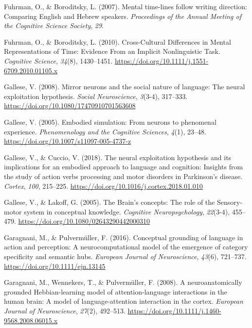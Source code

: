 \documentclass[
  a4paper,12pt,twoside,onecolumn,openright,final,oldfontcommands]{memoir}
\newlength{\cslhangindent}
\newlength{\cslentryspacingunit} %
\newenvironment{CSLReferences}[2] %
 {%
  \setlength{\parindent}{0pt}
  \ifodd #1
  \let\oldpar\par
  \def\par{\hangindent=\cslhangindent\oldpar}
  \fi
  \setlength{\parskip}{#2\cslentryspacingunit}
 }%
 {}
\begin{document}
\begin{CSLReferences}{1}{0}
\leavevmode{}%
Fuhrman, O., \& Boroditsky, L. (2007). Mental time-lines follow writing direction: {Comparing} {English} and {Hebrew} speakers. \emph{Proceedings of the Annual Meeting of the Cognitive Science Society}, \emph{29}.

\leavevmode{}%
Fuhrman, O., \& Boroditsky, L. (2010). Cross-{Cultural} {Differences} in {Mental} {Representations} of {Time}: {Evidence} {From} an {Implicit} {Nonlinguistic} {Task}. \emph{Cognitive Science}, \emph{34}(8), 1430--1451. \url{https://doi.org/10.1111/j.1551-6709.2010.01105.x}

\leavevmode{}%
Gallese, V. (2008). Mirror neurons and the social nature of language: {The} neural exploitation hypothesis. \emph{Social Neuroscience}, \emph{3}(3-4), 317--333. \url{https://doi.org/10.1080/17470910701563608}

\leavevmode{}%
Gallese, V. (2005). Embodied simulation: {From} neurons to phenomenal experience. \emph{Phenomenology and the Cognitive Sciences}, \emph{4}(1), 23--48. \url{https://doi.org/10.1007/s11097-005-4737-z}

\leavevmode{}%
Gallese, V., \& Cuccio, V. (2018). The neural exploitation hypothesis and its implications for an embodied approach to language and cognition: {Insights} from the study of action verbs processing and motor disorders in {Parkinson}'s disease. \emph{Cortex}, \emph{100}, 215--225. \url{https://doi.org/10.1016/j.cortex.2018.01.010}

\leavevmode{}%
Gallese, V., \& Lakoff, G. (2005). The {Brain}'s concepts: The role of the {Sensory}-motor system in conceptual knowledge. \emph{Cognitive Neuropsychology}, \emph{22}(3-4), 455--479. \url{https://doi.org/10.1080/02643290442000310}

\leavevmode{}%
Garagnani, M., \& Pulvermüller, F. (2016). Conceptual grounding of language in action and perception: A neurocomputational model of the emergence of category specificity and semantic hubs. \emph{European Journal of Neuroscience}, \emph{43}(6), 721--737. \url{https://doi.org/10.1111/ejn.13145}

\leavevmode{}%
Garagnani, M., Wennekers, T., \& Pulvermüller, F. (2008). A neuroanatomically grounded {Hebbian}-learning model of attention-language interactions in the human brain: {A} model of language-attention interaction in the cortex. \emph{European Journal of Neuroscience}, \emph{27}(2), 492--513. \url{https://doi.org/10.1111/j.1460-9568.2008.06015.x}


\end{CSLReferences}
\end{document}
